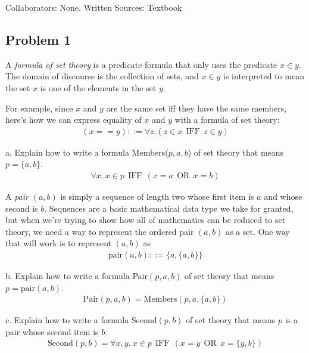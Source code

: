 \documentclass[12pt]{article}
\begin{document}
\setlength{\parindent}{0pt}\par{Collaborators: None. Written Sources: Textbook}
\subsection*{Problem 1}
\par{A \emph{formula of set theory} is a predicate formula that only uses the predicate $x \in y$. The domain of discourse is the collection of sets, and $x \in y$ is interpreted to mean the set $x$ is one of the elements in the set $y$.}
\par{For example, since $x$ and $y$ are the same set iff they have the same members, here's how we can express equality of $x$ and $y$ with a formula of set theory:}
\begin{align*}
(x == y) ::= \forall z. (z \in x\:\:\text{IFF}\:\:z \in y)
\end{align*}
\par{a. Explain how to write a formula Members($p, a, b$) of set theory that means $p = \{a, b\}$.}
\begin{align*}
\forall x.\: x \in p\:\:\text{IFF}\:\:(x = a\:\:\text{OR}\:\:x = b)
\end{align*}
\par{A \emph{pair} $(a, b)$ is simply a sequence of length two whose first item is $a$ and whose second is $b$. Sequences are a basic mathematical data type we take for granted, but when we're trying to show how all of mathematics can be reduced to set theory, we need a way to represent the ordered pair $(a, b)$ as a set. One way that will work is to represent $(a, b)$ as}
\begin{align*}
\text{pair}(a, b) ::= \{a, \{a, b\}\}
\end{align*}
\par{b. Explain how to write a formula Pair$(p, a, b)$ of set theory that means $p = \text{pair}(a, b)$.}
\begin{align*}
\text{Pair}(p, a, b) = \text{Members}(p, a, \{a, b\})
\end{align*}
\par{c. Explain how to write a formula Second$(p, b)$ of set theory that means $p$ is a pair whose second item is $b$.}
\begin{align*}
\text{Second}(p, b) = \forall x, y.\:x \in p\:\:\text{IFF}\:\:(x = y\:\:\text{OR}\:\:x = \{y, b\})
\end{align*}
\end{document}
